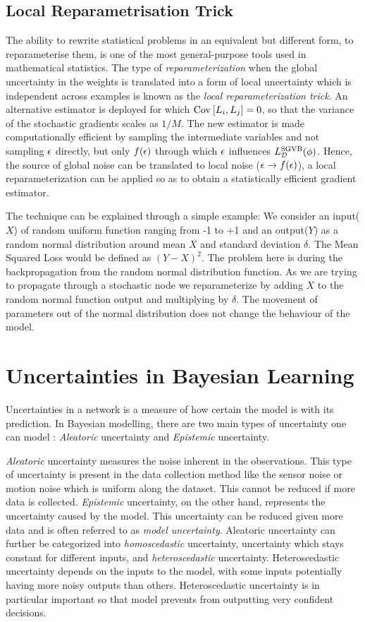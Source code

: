 \subsection{Local  Reparametrisation  Trick}
The ability to rewrite statistical problems in an equivalent but different form, to reparameterise them, is one of the most general-purpose tools used in mathematical statistics. The type of \textit{reparameterization} when the global uncertainty in the weights is translated into a form of local uncertainty which is independent across examples is known as the \emph{local reparameterization trick}. 
An alternative estimator is deployed for which $\text{Cov}_{}\left[L_{i},L_{j}\right] = 0$, so that the variance of the stochastic gradients scales as $1/M$.
The new estimator is made computationally efficient by sampling the intermediate variables and not sampling $\mathbf{\epsilon}$ directly, but only  $f(\mathbf{\epsilon})$ through which $\mathbf{\epsilon}$ influences $L_{\mathcal{D}}^\text{SGVB}(\mathbf{\phi})$. Hence, the source of global noise can be translated to local noise ($\mathbf{\epsilon} \rightarrow f(\mathbf{\epsilon})$), a local reparameterization can be applied so as to obtain a statistically efficient gradient estimator.

The technique can be explained through a simple example: We consider an input($X$) of random uniform function ranging from -1 to +1 and an output($Y$) as a random normal distribution around mean $X$ and standard deviation $\delta$. The Mean Squared Loss would be defined as 
$(Y-X)^2$. The problem here is during the backpropagation from the random normal distribution function. As we are trying to propagate through a stochastic node we reparameterize by adding $X$ to the random normal function output and multiplying by $\delta$.
The movement of parameters out of the normal distribution does not change the behaviour of the model. 


\section{Uncertainties in Bayesian Learning}


Uncertainties in a network is a measure of how certain the model is with its prediction. In Bayesian modelling, there are two main types of uncertainty one can model \citep{Kiureghian}: \textit{Aleatoric} uncertainty and \textit{Epistemic} uncertainty. 

\textit{Aleatoric} uncertainty measures the noise inherent in the observations. This type of uncertainty is present in the data collection method like the sensor noise or motion noise which is uniform along the dataset. This cannot be reduced if more data is collected. \textit{Epistemic} uncertainty, on the other hand, represents the uncertainty caused by the model. This uncertainty can be reduced given more data and is often referred to as \textit{model uncertainty}.  Aleatoric uncertainty can further be categorized into \textit{homoscedastic} uncertainty, uncertainty which stays constant for different inputs, and \textit{heteroscedastic} uncertainty. Heteroscedastic uncertainty depends on the inputs to the model, with some inputs potentially having more noisy outputs than others. Heteroscedastic uncertainty is in particular important so that model prevents from outputting very confident decisions.

